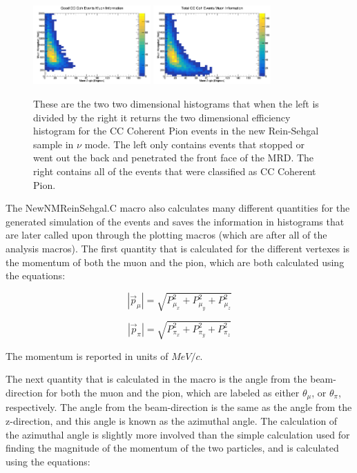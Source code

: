 \documentclass[11pt]{article}
\begin{document}
\begin{figure}[H]
\centering
\includegraphics[width=0.4\textwidth]{NewNMReinSehgalImages/7.png}
\includegraphics[width=0.4\textwidth]{NewNMReinSehgalImages/8.png}
\caption{These are the two two dimensional histograms that when the left is divided by the right it returns the two dimensional efficiency histogram for the CC Coherent Pion events in the new Rein-Sehgal sample in $\nu$ mode. The left only contains events that stopped or went out the back and penetrated the front face of the MRD. The right contains all of the events that were classified as CC Coherent Pion.}
\end{figure}

The NewNMReinSehgal.C macro also calculates many different quantities for the generated simulation of the events and saves the information in histograms that are later called upon through the plotting macros (which are after all of the analysis macros). The first quantity that is calculated for the different vertexes is the momentum of both the muon and the pion, which are both calculated using the equations:

\begin{equation}
|\vec{p}_\mu| = \sqrt{P_{\mu_x}^2 + P_{\mu_y}^2 + P_{\mu_z}^2}
\end{equation}

\begin{equation}
|\vec{p}_\pi| = \sqrt{P_{\pi_x}^2 + P_{\pi_y}^2 + P_{\pi_z}^2}
\end{equation}

\noindent
The momentum is reported in units of $MeV/c$.

The next quantity that is calculated in the macro is the angle from the beam-direction for both the muon and the pion, which are labeled as either $\theta_\mu$, or $\theta_\pi$, respectively. The angle from the beam-direction is the same as the angle from the z-direction, and this angle is known as the azimuthal angle. The calculation of the azimuthal angle is slightly more involved than the simple calculation used for finding the magnitude of the momentum of the two particles, and is calculated using the equations:
\end{document}
